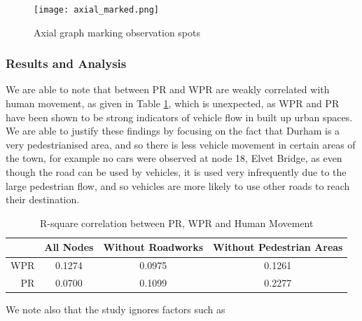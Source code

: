 \documentclass[11pt]{report}
\begin{document}
{\begin{figure}[h]
\centering
\texttt{[image: axial\_marked.png]}
\caption{Axial graph marking observation spots}
\label{fig:durham axial mark}
\end{figure}
\FloatBarrier

\subsubsection{Results and Analysis} \label{sec:results}
We are able to note that between PR and WPR are weakly correlated with human movement, as given in Table \ref{Table:Correlation}, which is unexpected, as WPR and PR have been shown to be strong indicators of vehicle flow in built up urban spaces. We are able to justify these findings by focusing on the fact that Durham is a very pedestrianised area, and so there is less vehicle movement in certain areas of the town, for example no cars were observed at node 18, Elvet Bridge, as even though the road can be used by vehicles, it is used very infrequently due to the large pedestrian flow, and so vehicles are more likely to use other roads to reach their destination.

\begin{table}[h]\caption{R-square correlation between PR, WPR and Human Movement}
\centering
\begin{tabular}{r| c | c c}
 & All Nodes & Without Roadworks & Without Pedestrian Areas\\
 \hline
 WPR & 0.1274 & 0.0975 & 0.1261\\
 PR & 0.0700 & 0.1099 & 0.2277 \\ 
\end{tabular}
\label{Table:Correlation}
\end{table}

We note also that the study ignores factors such as 

}
\end{document}
